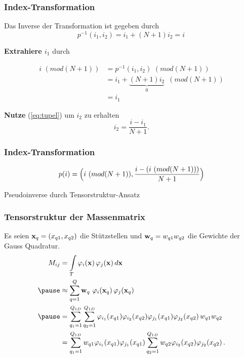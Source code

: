 \begin{frame}
\frametitle{Index-Transformation}
Das Inverse der Transformation ist gegeben durch
\begin{equation} \label{eq:tupel}
p^{-1}(i_1,i_2) = i_1 + (N+1)i_2 = i \, 
\end{equation}

\textbf{Extrahiere $i_1$} durch

\begin{equation*}
\begin{aligned}
i \, \, (mod (N+1)) &=p^{-1}(i_1,i_2) \, \, (mod (N+1)) \\ &= i_1 + \underbrace{(N+1)i_2}_{0} \, \, \, (mod (N+1)) \\ &= i_1
\end{aligned}
\end{equation*}

\textbf{Nutze} (\ref{eq:tupel}) um $i_2$ zu erhalten
\begin{equation*} \label{eq:tupel2}
 i_2 = \dfrac{ i - i_1 } {N+1}.
\end{equation*}
\end{frame}

\begin{frame}
\frametitle{Index-Transformation}
\begin{framed}
\begin{equation*} \label{eq:p}
p(i)= \Big{(} i \, \, (mod (N+1)),  \dfrac{ i -  (i \, \, (mod (N+1))) } {N+1} \Big{)}
\end{equation*}
\end{framed}
\end{frame}


\begin{frame}[plain]
\Huge{Pseudoinverse durch Tensorstruktur-Ansatz}
\end{frame}
\begin{frame}
\frametitle{Tensorstruktur der Massenmatrix}
Es seien $\bold{x}_q=(x_{q1},x_{q2})$ die Stützstellen und $\bold{w}_q=w_{q1}w_{q2}$ die Gewichte der Gauss Quadratur.
\begin{equation*} \label{eq:massapprox}
\begin{aligned}
M_{ij} &= \int\limits_{T} \varphi_i (\bold{x}) \, \varphi_j (\bold{x}) \, d\bold{x} \\ \pause
&\approx  \sum\limits_{q=1}^Q \bold{w}_q \, \, \varphi_i (\bold{x}_q) \, \varphi_j (\bold{x}_q) \\ \pause
&= \sum\limits_{q_1=1}^{Q_{1D}} \sum\limits_{q_2=1}^{Q_{1D}} \varphi_{i_1}(x_{q1}) \varphi_{i_2}(x_{q2}) \varphi_{j_1}(x_{q1}) \varphi_{j_2}(x_{q2}) \, w_{q1} w_{q2} \\ 
&= \sum\limits_{q_1=1}^{Q_{1D}} w_{q1} \varphi_{i_1}(x_{q1}) \varphi_{j_1}(x_{q1}) \sum\limits_{q_2=1}^{Q_{1D}} w_{q2} \varphi_{i_2}(x_{q2}) \varphi_{j_2}(x_{q2}) \, . 
\end{aligned}
\end{equation*}
\end{frame}

